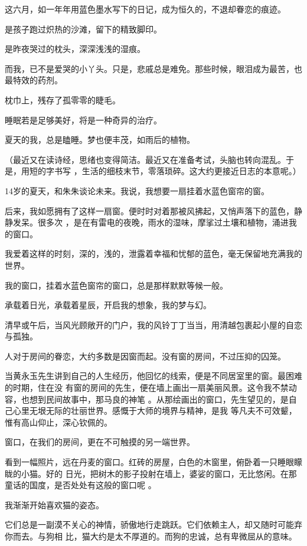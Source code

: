 \documentclass[12pt,a4paper]{article}
\begin{document}
		这六月，如一年年用蓝色墨水写下的日记，成为恒久的，不退却眷恋的痕迹。

		是孩子跑过炽热的沙滩，留下的精致脚印。\par
		是昨夜哭过的枕头，深深浅浅的湿痕。

		而我，已不是爱哭的小丫头。只是，悲戚总是难免。那些时候，眼泪成为最苦，也最特效的药剂。\par
		枕巾上，残存了孤零零的睫毛。

		睡眠若是足够美好，将是一种奇异的治疗。\par
		夏天的我，总是瞌睡。梦也便丰茂，如雨后的植物。

		（最近又在读诗经，思绪也变得简洁。最近又在准备考试，头脑也转向混乱。于是，用短的字书写
	，生活的细枝末节，零落琐碎。这大约更接近日志的本意呢。）

	\endwriting



		14岁的夏天，和朱朱谈论未来。我说，我想要一扇挂着水蓝色窗帘的窗。

		后来，我如愿拥有了这样一扇窗。便时时对着那被风拂起，又悄声落下的蓝色，静静发呆。很多次
	，是在有雷电的夜晚，雨水的湿味，摩挲过土壤和植物，涌进我的窗口。

		我爱着这样的时刻，深的，浅的，泄露着幸福和忧郁的蓝色，毫无保留地充满我的世界。

		我的窗口，挂着水蓝色窗帘的窗口，总是那样默默等候一般。\par
		承载着日光，承载着星辰，开启我的想象，我的梦与幻。\par
		清早或午后，当风光顾敞开的门户，我的风铃丁丁当当，用清越包裹起小屋的自恋与孤独。

		人对于房间的眷恋，大约多数是因窗而起。没有窗的房间，不过压抑的囚笼。

		当黄永玉先生讲到自己的人生经历，他回忆的线索，便是不同居室里的窗。最困难的时期，住在没
	有窗的房间的先生，便在墙上画出一扇美丽风景。这令我不禁动容，也想到民间故事中，那马良的神笔
	。从那绘画出的窗口，先生望见的，是自己心里无垠无际的壮丽世界。感慨于大师的境界与精神，是我
	等凡夫不可效颦，惟有高山仰止，深心钦佩的。

		窗口，在我们的房间，更在不可触摸的另一端世界。

		看到一幅照片，远在丹麦的窗口。红砖的房屋，白色的木窗里，俯卧着一只睡眼矇眬的小猫。好的
	日光，把树木的影子投射在墙上，婆娑的窗口，无比悠闲。在那童话的国度，是否处处有这般的窗口呢
	。

		我渐渐开始喜欢猫的姿态。

		它们总是一副漠不关心的神情，骄傲地行走跳跃。它们依赖主人，却又随时可能弃你而去。与狗相
	比，猫大约是太不厚道的。而狗的忠诚，总有卑微屈从的意味。
\end{document}
